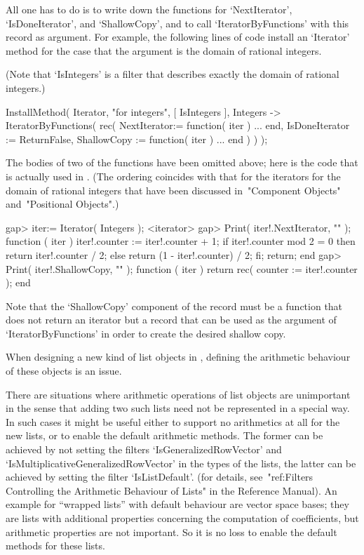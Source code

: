 All one has to do is to write down the functions for `NextIterator',
`IsDoneIterator', and `ShallowCopy', and to call
`IteratorByFunctions' with this record as argument.
For example, the following lines of code install an `Iterator' method
for the case that the argument is the domain of rational integers.

(Note that `IsIntegers' is a filter that describes exactly the domain of
rational integers.)

\begintt
InstallMethod( Iterator,
    "for integers",
    [ IsIntegers ],
    Integers -> IteratorByFunctions( rec(
                    NextIterator:= function( iter ) ... end,
                    IsDoneIterator := ReturnFalse,
                    ShallowCopy := function( iter ) ... end ) ) );
\endtt

The bodies of two of the functions have been omitted above;
here is the code that is actually used in {\GAP}.
(The ordering coincides with that for the iterators for the domain of
rational integers that have been discussed in~"Component Objects"
and~"Positional Objects".)

\beginexample
gap> iter:= Iterator( Integers );
<iterator>
gap> Print( iter!.NextIterator, "\n" );
function ( iter )
    iter!.counter := iter!.counter + 1;
    if iter!.counter mod 2 = 0  then
        return iter!.counter / 2;
    else
        return (1 - iter!.counter) / 2;
    fi;
    return;
end
gap> Print( iter!.ShallowCopy, "\n" );   
function ( iter )
    return rec(
        counter := iter!.counter );
end
\endexample

Note that the `ShallowCopy' component of the record must be a function
that does not return an iterator but a record that can be used as the
argument of `IteratorByFunctions' in order to create the desired
shallow copy.



When designing a new kind of list objects in {\GAP},
defining the arithmetic behaviour of these objects is an issue.

There are situations where arithmetic operations of list objects
are unimportant in the sense that adding two such lists need not be
represented in a special way.
In such cases it might be useful either to support no arithmetics at all
for the new lists, or to enable the default arithmetic methods.
The former can be achieved by not setting the filters
`IsGeneralizedRowVector' and `IsMultiplicativeGeneralizedRowVector'
in the types of the lists,
the latter can be achieved by setting the filter `IsListDefault'.
(for details, see~"ref:Filters Controlling the Arithmetic Behaviour of Lists"
in the {\GAP} Reference Manual).
An example for ``wrapped lists'' with default behaviour are vector space
bases;
they are lists with additional properties concerning the computation of
coefficients, but arithmetic properties are not important.
So it is no loss to enable the default methods for these lists.

